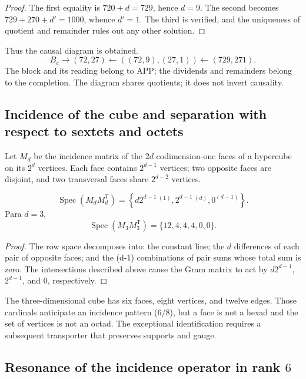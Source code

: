 \begin{proof}
The first equality is \(720+d=729\), hence \(d=9\). The second becomes
\(729+270+d'=1000\), whence \(d'=1\). The third is verified, and the
uniqueness of quotient and remainder rules out any other solution.
\end{proof}

Thus the causal diagram is obtained.
\[
 B_c\longrightarrow(72,27)
 \longleftarrow((72,9),(27,1))
 \longleftarrow(729,271).
\]
The block and its reading belong to APP; the dividends and remainders belong
to the completion. The diagram shares quotients; it does not invert
causality.

\subsection{Incidence of the cube and separation with respect to sextets and octets}

Let \(M_d\) be the incidence matrix of the \(2d\) codimension-one faces
of a hypercube on its \(2^d\) vertices. Each face contains
\(2^{d-1}\) vertices; two opposite faces are disjoint, and two
transversal faces share \(2^{d-2}\) vertices.

\begin{theorem}
\label{p12-83-c1-s5:thm:espectro-incidencia-cubo-autonomo}
\[
 \operatorname{Spec}(M_dM_d^{\mathsf T})
 =\left\{
 d2^{d-1}\,^{(1)},
 2^{d-1}\,^{(d)},
 0^{(d-1)}
 \right\}.
\]
Para \(d=3\),
\[
 \operatorname{Spec}(M_3M_3^{\mathsf T})
 =\{12,4,4,4,0,0\}.
\]
\end{theorem}

\begin{proof}
The row space decomposes into: the constant line; the \(d\)
differences of each pair of opposite faces; and the (d-1) combinations of
pair sums whose total sum is zero. The intersections described above
cause the Gram matrix to act by \(d2^{d-1}\), \(2^{d-1}\), and \(0\),
respectively.
\end{proof}

The three-dimensional cube has six faces, eight vertices, and twelve edges. Those
cardinals anticipate an incidence pattern (6/8), but a face is not
a hexad and the set of vertices is not an octad. The exceptional
identification requires a subsequent transporter that preserves supports and
gauge.

\subsection{Resonance of the incidence operator in rank \(6\)}

